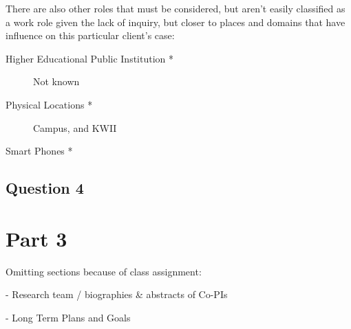 \documentclass[11pt]{article}
\begin{document}
  There are also other roles that must be considered, but aren't easily classified as a work role given the lack of inquiry, but closer to places and domains that have influence on this particular client's case:
  \begin{description} %
    \item[Higher Educational Public Institution \**]
    Not known\\
    \item[Physical Locations \**]
    Campus, and KWII\\
    \item[Smart Phones \**]


  \end{description}


  \subsection{Question 4}

\section*{Part 3} %


\newpage



Omitting sections because of class assignment:

 - Research team / biographies \& abstracts of Co-PIs

 - Long Term Plans and Goals
\end{document}
